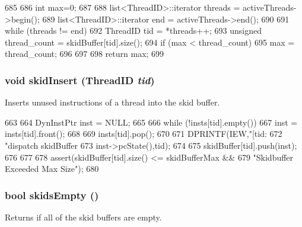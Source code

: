 \begin{DoxyCode}
685 {
686     int max=0;
687 
688     list<ThreadID>::iterator threads = activeThreads->begin();
689     list<ThreadID>::iterator end = activeThreads->end();
690 
691     while (threads != end) {
692         ThreadID tid = *threads++;
693         unsigned thread_count = skidBuffer[tid].size();
694         if (max < thread_count)
695             max = thread_count;
696     }
697 
698     return max;
699 }
\end{DoxyCode}
\hypertarget{classDefaultIEW_ac24515147270ef9b85991bbe13bd47af}{
\subsubsection[{skidInsert}]{\setlength{\rightskip}{0pt plus 5cm}void skidInsert ({\bf ThreadID} {\em tid})}}
\label{classDefaultIEW_ac24515147270ef9b85991bbe13bd47af}
Inserts unused instructions of a thread into the skid buffer. 


\begin{DoxyCode}
663 {
664     DynInstPtr inst = NULL;
665 
666     while (!insts[tid].empty()) {
667         inst = insts[tid].front();
668 
669         insts[tid].pop();
670 
671         DPRINTF(IEW,"[tid:%
672                 "dispatch skidBuffer %
673                 inst->pcState(),tid);
674 
675         skidBuffer[tid].push(inst);
676     }
677 
678     assert(skidBuffer[tid].size() <= skidBufferMax &&
679            "Skidbuffer Exceeded Max Size");
680 }
\end{DoxyCode}
\hypertarget{classDefaultIEW_afe3e2673d17dd5c568862ef5ae68b4d8}{
\subsubsection[{skidsEmpty}]{\setlength{\rightskip}{0pt plus 5cm}bool skidsEmpty ()}}
\label{classDefaultIEW_afe3e2673d17dd5c568862ef5ae68b4d8}
Returns if all of the skid buffers are empty. 


